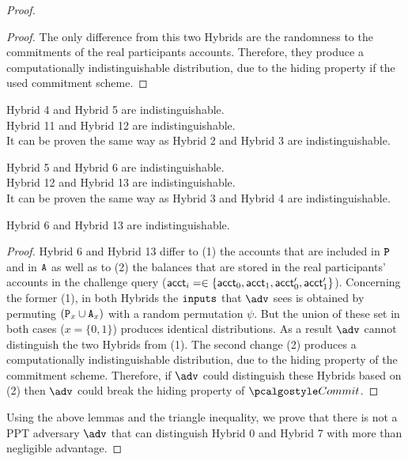 \begin{proof}
\begin{proof}
    The only difference from this two Hybrids are the randomness to the commitments of the real participants accounts. Therefore, they produce a computationally indistinguishable distribution, due to the hiding property if the used commitment scheme.
\end{proof}
\begin{corollary}
    Hybrid 4 and Hybrid 5 are indistinguishable.\\
    Hybrid 11 and Hybrid 12 are indistinguishable.\\
    It can be proven the same way as Hybrid 2 and Hybrid 3 are indistinguishable.
\end{corollary}
\begin{corollary}
    Hybrid 5 and Hybrid 6 are indistinguishable.\\
    Hybrid 12 and Hybrid 13 are indistinguishable.\\
    It can be proven the same way as Hybrid 3 and Hybrid 4 are indistinguishable.
\end{corollary}

    


    

\begin{lemma}
    Hybrid 6 and Hybrid 13 are indistinguishable.
\end{lemma}


\begin{proof}
    Hybrid 6 and Hybrid 13 differ to (1) the accounts that are included in $\mathtt{P}$ and in ${\mathtt{A}}$ as well as to (2) the balances that are stored in the real participants' accounts in the challenge query ($\textup{\textsf{acct}}_i = \in \{\textup{\textsf{acct}}_0, \textup{\textsf{acct}}_1, \textup{\textsf{acct}}_0^\prime, \textup{\textsf{acct}}_1^\prime\}$). Concerning the former (1), in both Hybrids the ${\textup{\texttt{inputs}}}$ that $\adv$ sees is obtained by permuting $(\mathtt{P}_x \cup {\mathtt{A}}_x)$ with a random permutation $\psi$. But the union of these set in both cases ($x=\{0,1\}$) produces identical distributions. As a result $\adv$ cannot distinguish the two Hybrids from (1). The second change (2) produces a computationally indistinguishable distribution, due to the hiding property of the commitment scheme. Therefore, if $\adv$ could distinguish these Hybrids based on (2) then $\adv$ could break the hiding property of $\commit$.
\end{proof}

Using the above lemmas and the triangle inequality, we prove that there is not a PPT adversary $\adv$ that can distinguish Hybrid 0 and Hybrid 7 with more than negligible advantage.

\end{proof}